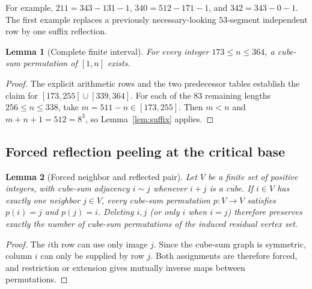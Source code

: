 \documentclass[10pt]{article}
\newtheorem{lemma}{Lemma}
\begin{document}
For example, $211=343-131-1$,
$340=512-171-1$, and $342=343-0-1$.
The first example replaces a previously
necessary-looking $53$-segment independent
row by one suffix reflection.

\begin{lemma}[Complete finite interval]\label{lem:base}
For every integer $173\le n\le364$,
a cube-sum permutation of $[1,n]$ exists.
\end{lemma}
\begin{proof}
The explicit arithmetic rows and the two
predecessor tables establish the claim for
$[173,255]\cup[339,364]$. For each of the
$83$ remaining lengths $256\le n\le338$,
take $m=511-n\in[173,255]$.
Then $m<n$ and $m+n+1=512=8^3$,
so Lemma~\ref{lem:suffix} applies.
\end{proof}

\subsection{Forced reflection peeling at the critical base}
\label{subsec:forced-reflection-peeling}

\begin{lemma}[Forced neighbor and reflected pair]
\label{lem:forced-neighbor}
Let $V$ be a finite set of positive integers, with
cube-sum adjacency $i\sim j$ whenever $i+j$ is a
cube. If $i\in V$ has exactly one neighbor $j\in V$,
every cube-sum permutation $p:V\to V$ satisfies
$p(i)=j$ and $p(j)=i$. Deleting $i,j$ (or only
$i$ when $i=j$) therefore preserves exactly the
number of cube-sum permutations of the induced
residual vertex set.
\end{lemma}
\begin{proof}
The $i$th row can use only image $j$.
Since the cube-sum graph is symmetric, column $i$
can only be supplied by row $j$. Both assignments
are therefore forced, and restriction or extension
gives mutually inverse maps between permutations.
\end{proof}
\end{document}
